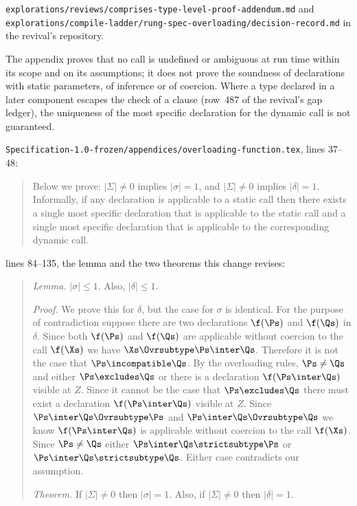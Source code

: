 \begin{description}
\nolinkurl{explorations/reviews/comprises-type-level-proof-addendum.md} and
\nolinkurl{explorations/compile-ladder/rung-spec-overloading/decision-record.md}
in the revival's repository.
\item[Effect] The appendix proves that no call is undefined or ambiguous at run
time within its scope and on its assumptions; it does not prove the soundness of
declarations with static parameters, of inference or of coercion.
Where a type declared in a later component escapes the check of a
 clause (row~487 of the revival's gap ledger), the uniqueness of
the most specific declaration for the dynamic call is not guaranteed.
\item[Original text] \nolinkurl{Specification-1.0-frozen/appendices/overloading-function.tex},
lines 37--48:
\begin{quote}
Below we prove: $|\Sigma| \neq 0$ implies $|\sigma| = 1$, and $|\Sigma| \neq 0$
implies $|\delta| = 1$.
Informally, if any declaration is applicable to a static call then there exists
a single most specific declaration that is applicable to the static call and a
single most specific declaration that is applicable to the corresponding
dynamic call.
\end{quote}
lines 84--135, the lemma and the two theorems this change revises:
\begin{quote}
\emph{Lemma.} $|\sigma| \le 1$.  Also, $|\delta| \le 1$.

\emph{Proof.} We prove this for $\delta$, but the case for $\sigma$ is
identical.
For the purpose of contradiction suppose there are two declarations
$\f(\Ps)$ and $\f(\Qs)$ in $\delta$.  Since both $\f(\Ps)$ and
$\f(\Qs)$ are applicable without coercion to the call $\f(\Xs)$ we
have $\Xs \Ovrsubtype \Ps \inter \Qs$.  Therefore it is not the case
that $\Ps \incompatible \Qs$.  By the overloading rules, $\Ps
\neq \Qs$ and either $\Ps \excludes \Qs$ or there is a declaration
$\f(\Ps \inter \Qs)$ visible at $Z$.  Since it cannot be the case that
$\Ps \excludes \Qs$ there must exist a declaration $\f(\Ps \inter
\Qs)$ visible at $Z$.  Since $\Ps \inter \Qs \Ovrsubtype \Ps$ and $\Ps
\inter \Qs \Ovrsubtype \Qs$ we know $\f(\Ps \inter \Qs)$ is applicable
without coercion to the call $\f(\Xs)$.  Since $\Ps \neq \Qs$ either
$\Ps \inter \Qs \strictsubtype \Ps$ or $\Ps \inter \Qs \strictsubtype
\Qs$.  Either case contradicts our assumption.

\emph{Theorem.} If $|\Sigma| \neq 0$ then $|\sigma| = 1$.  Also, if
$|\Sigma| \neq 0$ then $|\delta| = 1$.


\end{quote}
\end{description}
